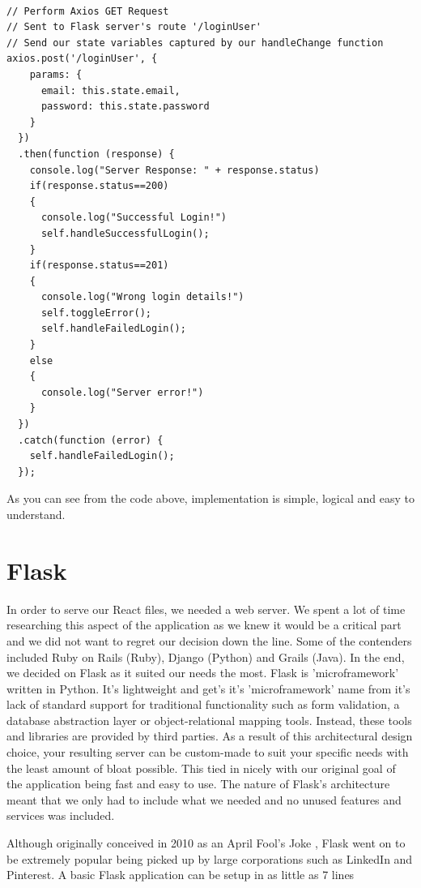 \begin{verbatim}

// Perform Axios GET Request
// Sent to Flask server's route '/loginUser'
// Send our state variables captured by our handleChange function 
axios.post('/loginUser', {
    params: {
      email: this.state.email,
      password: this.state.password
    }
  })
  .then(function (response) {
    console.log("Server Response: " + response.status)
    if(response.status==200)
    {
      console.log("Successful Login!")
      self.handleSuccessfulLogin();
    }
    if(response.status==201)
    {
      console.log("Wrong login details!")
      self.toggleError();
      self.handleFailedLogin();
    }
    else
    {
      console.log("Server error!")
    }
  })
  .catch(function (error) {
    self.handleFailedLogin();
  });  
\end{verbatim}

As you can see from the code above, implementation is simple, logical and easy to understand.


\section{Flask}
In order to serve our React files, we needed a web server. We spent a lot of time researching this aspect of the application as we knew it would be a critical part and we did not want to regret our decision down the line. Some of the contenders included Ruby on Rails (Ruby), Django (Python) and 
Grails (Java). In the end, we decided on Flask as it suited our needs the most. Flask is 'microframework' written in Python. It's lightweight and get's it's 'microframework' name from it's lack of standard support for traditional functionality such as form validation, a database abstraction layer or object-relational mapping tools. Instead, these tools and libraries are provided by third parties. 
As a result of this architectural design choice, your resulting server can be custom-made to suit your specific needs with the least amount of bloat possible. This tied in nicely with our original goal of the application being fast and easy to use. The nature of Flask's architecture meant that we only had to include what we needed and no unused features and services was included.

Although originally conceived in 2010 as an April Fool's Joke \cite{FlaskOrigins}, Flask went on to be extremely popular being picked up by large corporations such as LinkedIn and Pinterest. A basic Flask application can be setup in as little as 7 lines 

